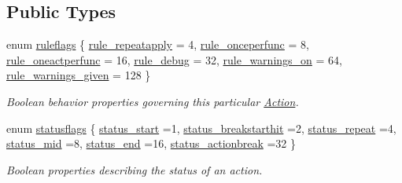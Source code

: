 \subsection*{Public Types}
\begin{DoxyCompactItemize}
\item 
enum \mbox{\hyperlink{class_action_a5e5eb18ea0fb52e18d0184a3e6726847}{ruleflags}} \{ \newline
\mbox{\hyperlink{class_action_a5e5eb18ea0fb52e18d0184a3e6726847a60bffd0acc879a222a0608055eeae7e5}{rule\+\_\+repeatapply}} = 4, 
\mbox{\hyperlink{class_action_a5e5eb18ea0fb52e18d0184a3e6726847aaf92b4acb1af944f4b7f012fd50f53fe}{rule\+\_\+onceperfunc}} = 8, 
\mbox{\hyperlink{class_action_a5e5eb18ea0fb52e18d0184a3e6726847afbf69591d3b69628be7722eef381482d}{rule\+\_\+oneactperfunc}} = 16, 
\mbox{\hyperlink{class_action_a5e5eb18ea0fb52e18d0184a3e6726847a7fd6612efab8d024eb2b197e765b8cde}{rule\+\_\+debug}} = 32, 
\newline
\mbox{\hyperlink{class_action_a5e5eb18ea0fb52e18d0184a3e6726847a8b78f4f4008a9678c9cc7c42854569dc}{rule\+\_\+warnings\+\_\+on}} = 64, 
\mbox{\hyperlink{class_action_a5e5eb18ea0fb52e18d0184a3e6726847a2da998c99ab4ef0292bddcd89143e0be}{rule\+\_\+warnings\+\_\+given}} = 128
 \}
\begin{DoxyCompactList}\small\item\em Boolean behavior properties governing this particular \mbox{\hyperlink{class_action}{Action}}. \end{DoxyCompactList}\item 
enum \mbox{\hyperlink{class_action_adfa1c8c9c12ae9fccf0f0c743d420ff5}{statusflags}} \{ \newline
\mbox{\hyperlink{class_action_adfa1c8c9c12ae9fccf0f0c743d420ff5adf4a8f6119522a19ed862af8d9eef5a5}{status\+\_\+start}} =1, 
\mbox{\hyperlink{class_action_adfa1c8c9c12ae9fccf0f0c743d420ff5ab42f02d6eb6e55819b26fb221f47c06b}{status\+\_\+breakstarthit}} =2, 
\mbox{\hyperlink{class_action_adfa1c8c9c12ae9fccf0f0c743d420ff5a1f2aab8cb6882e3263797df564764f18}{status\+\_\+repeat}} =4, 
\mbox{\hyperlink{class_action_adfa1c8c9c12ae9fccf0f0c743d420ff5a40d19ee03bb610d01f460363b35730b3}{status\+\_\+mid}} =8, 
\newline
\mbox{\hyperlink{class_action_adfa1c8c9c12ae9fccf0f0c743d420ff5a5e1b4326228d49f46d5458bd2e2c624a}{status\+\_\+end}} =16, 
\mbox{\hyperlink{class_action_adfa1c8c9c12ae9fccf0f0c743d420ff5a986c37250ce8cd49f927076e6e0c3253}{status\+\_\+actionbreak}} =32
 \}
\begin{DoxyCompactList}\small\item\em Boolean properties describing the {\itshape status} of an action. \end{DoxyCompactList}\item 

\end{DoxyCompactItemize}
